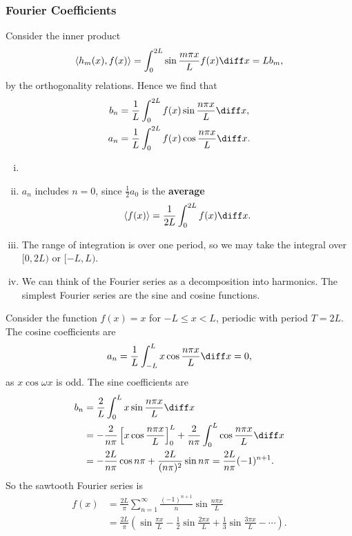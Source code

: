 \documentclass[12pt]{article}
\begin{document}
\subsubsection{Fourier Coefficients}%
\label{subsub:fourier_coefficients}

Consider the inner product
\[
	\langle h_m(x), f(x) \rangle = \int_{0}^{2L} \sin \frac{m \pi x}{L} f(x)\diff x = L b_m
,\]
by the orthogonality relations. Hence we find that
\begin{align*}
	b_n &= \frac{1}{L} \int_{0}^{2L}f(x) \sin \frac{n \pi x}{L}\diff x, \\
	a_n &= \frac{1}{L} \int_{0}^{2L}f(x) \cos \frac{n \pi x}{L}\diff x.
\end{align*}
\begin{remark}
	\begin{enumerate}[(i)]
		\item[]
		\item $a_n$ includes $n = 0$, since $\frac{1}{2} a_0$ is the \textbf{average}
			\[
				\langle f(x) \rangle = \frac{1}{2L} \int_{0}^{2L} f(x)\diff x
			.\]
		\item The range of integration is over one period, so we may take the integral over $[0, 2L)$ or $[-L, L)$.
		\item We can think of the Fourier series as a decomposition into harmonics. The simplest Fourier series are the sine and cosine functions.
	\end{enumerate}	
\end{remark}

\begin{exbox}
	Consider the function $f(x) = x$ for $-L \leq x < L$, periodic with period $T = 2L$. The cosine coefficients are
	\[
	a_n = \frac{1}{L} \int_{-L}^{L} x \cos \frac{n \pi x}{L}\diff x = 0
	,\]
	as $x \cos \omega x$ is odd. The sine coefficients are
	\begin{align*}
		b_n &= \frac{2}{L} \int_{0}^{L} x \sin \frac{n \pi x}{L}\diff x \\
		    &= -\frac{2}{n \pi} \left[ x \cos \frac{n \pi x}{L} \right]_{0}^{L} + \frac{2}{n \pi} \int_{0}^{L} \cos \frac{n \pi x}{L}\diff x \\
		    &= - \frac{2L}{n \pi} \cos n \pi + \frac{2L}{(n \pi)^2} \sin n \pi = \frac{2L}{n \pi }(-1)^{n+1}.
	\end{align*}
	So the sawtooth Fourier series is
	\begin{align*}
		f(x) &= \frac{2L}{\pi} \sum_{n = 1}^{\infty} \frac{(-1)^{n+1}}{n} \sin \frac{n \pi x}{L} \\
		     &= \frac{2L}{\pi} \left( \sin \frac{\pi x}{L} - \frac{1}{2} \sin \frac{2 \pi x}{L} + \frac{1}{3} \sin \frac{3 \pi x}{L} - \cdots \right).
	\end{align*}
\end{exbox}
\end{document}
